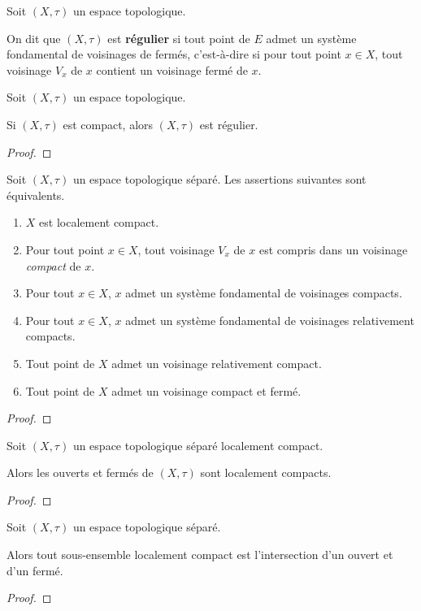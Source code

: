 \begin{definition}
	Soit $(X, \tau)$ un espace topologique.

	On dit que $(X, \tau)$ est \textbf{régulier} si tout point de $E$ admet un
	système fondamental de voisinages de fermés, c'est-à-dire si pour tout point
	$x \in X$, tout voisinage $V_{x}$ de $x$ contient un voisinage fermé de $x$.
\end{definition}

\begin{proposition}
	Soit $(X, \tau)$ un espace topologique.

	Si $(X, \tau)$ est compact, alors $(X, \tau)$ est régulier.
\end{proposition}

\ifdefined\outputproof
\begin{proof}

\end{proof}
\fi

\begin{theorem}
	Soit $(X, \tau)$ un espace topologique séparé. Les assertions suivantes sont
	équivalents.

	\begin{enumerate}
		\item $X$ est localement compact.
		\item Pour tout point $x \in X$, tout voisinage $V_{x}$ de $x$ est
			compris dans un voisinage \textit{compact} de $x$.
		\item Pour tout $x \in X$, $x$ admet un système fondamental de
			voisinages compacts.
		\item Pour tout $x \in X$, $x$ admet un système fondamental de
			voisinages relativement compacts.
		\item Tout point de $X$ admet un voisinage relativement compact.
		\item Tout point de $X$ admet un voisinage compact et fermé.
	\end{enumerate}
\end{theorem}

\ifdefined\outputproof
\begin{proof}

\end{proof}
\fi

\begin{proposition}
	Soit $(X, \tau)$ un espace topologique séparé localement compact.

	Alors les ouverts et fermés de $(X, \tau)$ sont localement compacts.
\end{proposition}

\ifdefined\outputproof
\begin{proof}

\end{proof}
\fi

\begin{proposition}
	Soit $(X, \tau)$ un espace topologique séparé.

	Alors tout sous-ensemble localement compact est l'intersection d'un ouvert
	et d'un fermé.
\end{proposition}

\ifdefined\outputproof
\begin{proof}

\end{proof}
\fi
